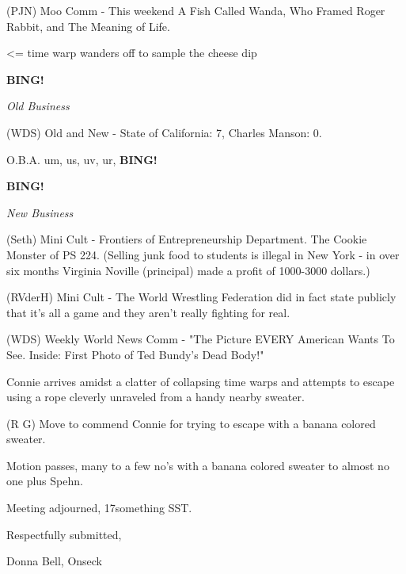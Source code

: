 \documentclass[12pt]{article}
\newcommand{\bing}{{\bf BING!} }
\newcommand{\goto}[1]{\bing \vskip 12pt \centerline{{\em{#1}}}}
\begin{document}
(PJN) Moo Comm - This weekend A Fish Called Wanda, Who Framed Roger Rabbit, and The Meaning of Life.

<= time warp wanders off to sample the cheese dip

\goto{Old Business}

(WDS) Old and New - State of California: 7, Charles Manson: 0.

O.B.A. um, us, uv, ur, \bing

\goto{New Business}

(Seth) Mini Cult - Frontiers of Entrepreneurship Department.  The Cookie Monster of PS 224. (Selling junk food to students is illegal in New York - in over six months Virginia Noville (principal) made a
profit of 1000-3000 dollars.)

(RVderH) Mini Cult - The World Wrestling Federation did in fact state publicly that it's all a game and they aren't really fighting for real.

(WDS) Weekly World News Comm - "The Picture EVERY American Wants To See. Inside: First Photo of Ted Bundy's Dead Body!"

Connie arrives amidst a clatter of collapsing time warps and attempts to escape using a rope cleverly unraveled from a handy nearby sweater.

(R G) Move to commend Connie for trying to escape with a banana colored sweater.

Motion passes, many to a few no's with a banana colored sweater to almost no one plus Spehn.

\vspace{12pt}

\noindent
Meeting adjourned, 17something SST.

\vspace{18pt}

\centerline{Respectfully submitted,}
\centerline{Donna Bell, Onseck}
\end{document}
